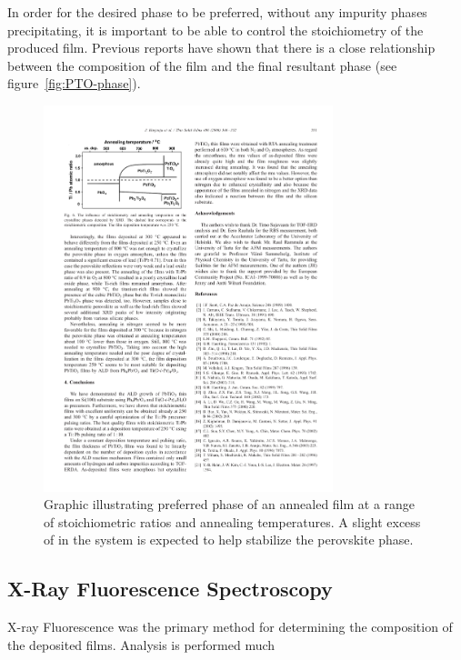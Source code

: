 In order for the desired phase to be preferred, without any impurity phases precipitating, it is important to be able to control the stoichiometry of the produced film. Previous reports have shown that there is a close relationship between the composition of the film and the final resultant phase (see figure~\vref{fig:PTO-phase}).\cite{harjuoja_2006} 

\begin{figure}[tb]
   \centering
   \includegraphics[width=0.75\textwidth]{./figures/dataanalysis/PTO-phase}
   \caption[Preferred Phase vs. Stoichiometric Ratio]{Graphic illustrating preferred phase of an annealed %
   		film at a range of stoichiometric ratios and annealing temperatures. A slight excess of  %
		in the system is expected to help stabilize the perovskite \PTO{} phase.\cite{harjuoja_2006}}
   \label{fig:PTO-phase}
\end{figure}

\lipsum


\subsection{X-Ray Fluorescence Spectroscopy}

X-ray Fluorescence was the primary method for determining the composition of the deposited films. Analysis is performed much 


